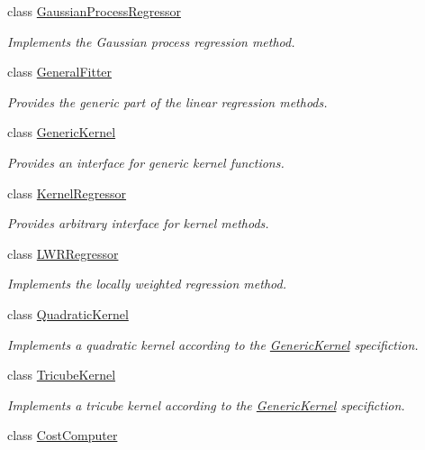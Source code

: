 \begin{DoxyCompactItemize}
class \hyperlink{classkukadu_1_1GaussianProcessRegressor}{Gaussian\-Process\-Regressor}
\begin{DoxyCompactList}\small\item\em Implements the Gaussian process regression method. \end{DoxyCompactList}\item 
class \hyperlink{classkukadu_1_1GeneralFitter}{General\-Fitter}
\begin{DoxyCompactList}\small\item\em Provides the generic part of the linear regression methods. \end{DoxyCompactList}\item 
class \hyperlink{classkukadu_1_1GenericKernel}{Generic\-Kernel}
\begin{DoxyCompactList}\small\item\em Provides an interface for generic kernel functions. \end{DoxyCompactList}\item 
class \hyperlink{classkukadu_1_1KernelRegressor}{Kernel\-Regressor}
\begin{DoxyCompactList}\small\item\em Provides arbitrary interface for kernel methods. \end{DoxyCompactList}\item 
class \hyperlink{classkukadu_1_1LWRRegressor}{L\-W\-R\-Regressor}
\begin{DoxyCompactList}\small\item\em Implements the locally weighted regression method. \end{DoxyCompactList}\item 
class \hyperlink{classkukadu_1_1QuadraticKernel}{Quadratic\-Kernel}
\begin{DoxyCompactList}\small\item\em Implements a quadratic kernel according to the \hyperlink{classkukadu_1_1GenericKernel}{Generic\-Kernel} specifiction. \end{DoxyCompactList}\item 
class \hyperlink{classkukadu_1_1TricubeKernel}{Tricube\-Kernel}
\begin{DoxyCompactList}\small\item\em Implements a tricube kernel according to the \hyperlink{classkukadu_1_1GenericKernel}{Generic\-Kernel} specifiction. \end{DoxyCompactList}\item 
class \hyperlink{classkukadu_1_1CostComputer}{Cost\-Computer}

\end{DoxyCompactItemize}
